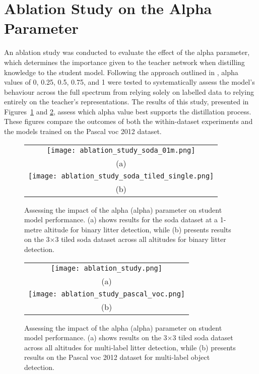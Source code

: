 \section{Ablation Study on the Alpha Parameter}
\label{sec:5_alpha_exp}

An ablation study was conducted to evaluate the effect of the \gls{alpha} parameter, which determines the importance given to the teacher network when distilling knowledge to the student model. Following the approach outlined in \cite{lab2wild}, \gls{alpha} values of 0, 0.25, 0.5, 0.75, and 1 were tested to systematically assess the model’s behaviour across the full spectrum from relying solely on labelled data to relying entirely on the teacher’s representations. The results of this study, presented in Figures~\ref{fig:ablation_combined} and \ref{fig:ablation_combined2}, assess which \gls{alpha} value best supports the distillation process. These figures compare the outcomes of both the within-dataset experiments and the models trained on the Pascal \gls{voc} 2012 dataset.

\begin{figure}[!ht]
    \centering
    \begin{tabular}{c}
        \texttt{[image: ablation\_study\_soda\_01m.png]} \\
        \small (a) \\
        \addlinespace[1em]
        \texttt{[image: ablation\_study\_soda\_tiled\_single.png]} \\
        \small (b) \\
    \end{tabular}
    \caption{Assessing the impact of the alpha (\gls{alpha}) parameter on student model performance. 
    (a) shows results for the \gls{soda} dataset at a 1-metre altitude for binary litter detection, while 
    (b) presents results on the 3$\times$3 tiled \gls{soda} dataset across all altitudes for binary litter detection.}
    \label{fig:ablation_combined}
\end{figure}

\begin{figure}[!ht]
    \centering
    \begin{tabular}{c}
        \texttt{[image: ablation\_study.png]} \\
        \small (a) \\
        \addlinespace[1em]
        \texttt{[image: ablation\_study\_pascal\_voc.png]} \\
        \small (b) \\
    \end{tabular}
    \caption{Assessing the impact of the alpha (\gls{alpha}) parameter on student model performance. 
    (a) shows results on the 3$\times$3 tiled \gls{soda} dataset across all altitudes for multi-label litter detection, while 
    (b) presents results on the Pascal \gls{voc} 2012 dataset for multi-label object detection.}
    \label{fig:ablation_combined2}
\end{figure}

